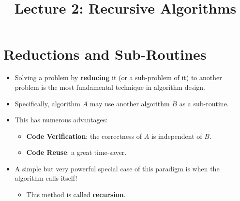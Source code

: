 \documentclass[12pt]{article}
\title{\huge Lecture 2: Recursive Algorithms}
\author{}
\date{}
\begin{document}
\maketitle
\section{Reductions and Sub-Routines}
\renewcommand{\labelitemii}{$\circ$}
\renewcommand{\labelitemiii}{$\cdot$}
\renewcommand{\labelitemiii}{$\rightarrow$}
\begin{itemize}
\item Solving a problem by \textbf{reducing} it (or a sub-problem of it) to another problem is the most fundamental technique in algorithm design.
\item Specifically, algorithm $A$ may use another algorithm $B$ as a sub-routine.
\item This has numerous advantages:
	\begin{itemize}
	\item \textbf{Code Verification}: the correctness of $A$ is independent of $B$.
	\item \textbf{Code Reuse}: a great time-saver.
	\end{itemize}
\item A simple but very powerful special case of this paradigm is when the algorithm calls itself!
	\begin{itemize}
	\item This method is called \textbf{recursion}.
	\end{itemize}
\end{itemize}
\end{document}
